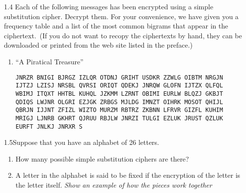 \begin{exercise}
    {1.4} Each of the following messages has been encrypted using a simple substitution cipher. Decrypt them. For your convenience, we have given you a frequency table and a list of the most common bigrams that appear in the ciphertext.\ (If you do not want to recopy the ciphertexts by hand, they can be downloaded or printed from the web site listed in the preface.)
    \begin{enumerate}
        \item “A Piratical Treasure”
              \begin{flushleft}
                  \texttt{JNRZR BNIGI BJRGZ IZLQR OTDNJ GRIHT USDKR ZZWLG OIBTM NRGJN} \\
                  \texttt{IJTZJ LZISJ NRSBL QVRSI ORIQT QDEKJ JNRQW GLOFN IJTZX QLFQL} \\
                  \texttt{WBIMJ ITQXT HHTBL KUHQL JZKMM LZRNT OBIMI EURLW BLQZJ GKBJT} \\
                  \texttt{QDIQS LWJNR OLGRI EZJGK ZRBGS MJLDG IMNZT OIHRK MOSOT QHIJL} \\
                  \texttt{QBRJN IJJNT ZFIZL WIZTO MURZM RBTRZ ZKBNN LFRVR GIZFL KUHIM} \\
                  \texttt{MRIGJ LJNRB GKHRT QJRUU RBJLW JNRZI TULGI EZLUK JRUST QZLUK} \\
                  \texttt{EURFT JNLKJ JNRXR S}
              \end{flushleft}
    \end{enumerate}
\end{exercise}


\begin{exercise}
    {1.5}Suppose that you have an alphabet of 26 letters.
    \begin{enumerate}
        \item How many possible simple substitution ciphers are there?
        \item A letter in the alphabet is said to be fixed if the encryption of the letter is the letter itself. \textit{Show an example of how the pieces work together}
    \end{enumerate}
\end{exercise}

